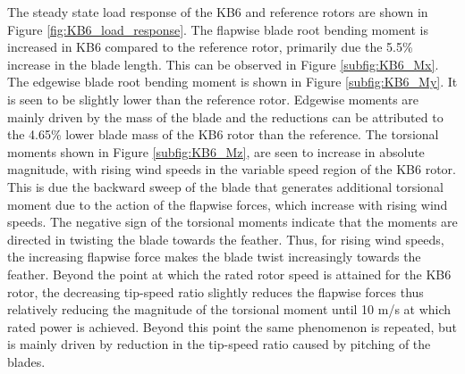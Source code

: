 The steady state load response of the KB6 and reference rotors are shown in Figure \ref{fig:KB6_load_response}. The flapwise blade root bending moment is increased in KB6 compared to the reference rotor, primarily due the 5.5\% increase in the blade length. This can be observed in Figure \ref{subfig:KB6_Mx}. The edgewise blade root bending moment is shown in Figure \ref{subfig:KB6_My}. It is seen to be slightly lower than the reference rotor. Edgewise moments are mainly driven by the mass of the blade and the reductions can be attributed to the 4.65\% lower blade mass of the KB6 rotor than the reference. The torsional moments shown in Figure \ref{subfig:KB6_Mz}, are seen to increase in absolute magnitude, with rising wind speeds in the variable speed region of the KB6 rotor. This is due the backward sweep of the blade that generates additional torsional moment due to the action of the flapwise forces, which increase with rising wind speeds. The negative sign of the torsional moments indicate that the moments are directed in twisting the blade towards the feather. Thus, for rising wind speeds, the increasing flapwise force makes the blade twist increasingly towards the feather. Beyond the point at which the rated rotor speed is attained for the KB6 rotor, the decreasing tip-speed ratio slightly reduces the flapwise forces thus relatively reducing the magnitude of the torsional moment until 10 m/s at which rated power is achieved. Beyond this point the same phenomenon is repeated, but is mainly driven by reduction in the tip-speed ratio caused by pitching of the blades.


